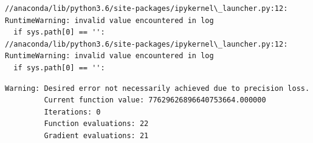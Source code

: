 \documentclass[11pt]{article}
\begin{document}
    \begin{Verbatim}[commandchars=\\\{\}]
//anaconda/lib/python3.6/site-packages/ipykernel\_launcher.py:12: RuntimeWarning: invalid value encountered in log
  if sys.path[0] == '':
//anaconda/lib/python3.6/site-packages/ipykernel\_launcher.py:12: RuntimeWarning: invalid value encountered in log
  if sys.path[0] == '':

    \end{Verbatim}

    \begin{Verbatim}[commandchars=\\\{\}]
Warning: Desired error not necessarily achieved due to precision loss.
         Current function value: 77629626896640753664.000000
         Iterations: 0
         Function evaluations: 22
         Gradient evaluations: 21

    \end{Verbatim}

    \begin{center}
    \end{center}
    { \hspace*{\fill} \\}
    
\end{document}
